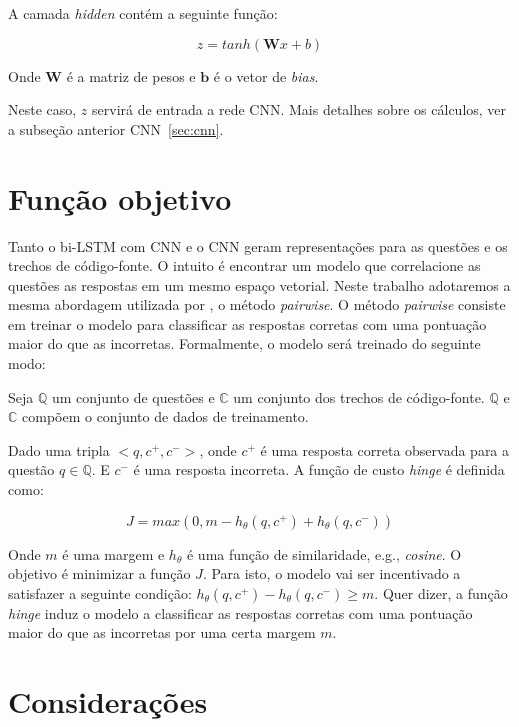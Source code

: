 A camada \textit{hidden} contém a seguinte função:

\begin{equation}
z = tanh(\bm{W}x + b)
\end{equation}

Onde $\bm{W}$ é a matriz de pesos e $\bm{b}$ é o vetor de \textit{bias}.

Neste caso, $z$ servirá de entrada a rede CNN. Mais detalhes sobre os cálculos, ver a subseção anterior CNN~\ref{sec:cnn}.


\section{Função objetivo}

Tanto o bi-LSTM com CNN e o CNN geram representações para as questões e os trechos de código-fonte. O intuito é encontrar um modelo que correlacione as questões as respostas em um mesmo espaço vetorial. Neste trabalho adotaremos a mesma abordagem utilizada por \cite{feng-2015}, o método \textit{pairwise}. O método \textit{pairwise} consiste em treinar o modelo para classificar as respostas corretas com uma pontuação maior do que as incorretas. Formalmente, o modelo será treinado do seguinte modo:

Seja $\mathbb{Q}$ um conjunto de questões e $\mathbb{C}$ um conjunto dos trechos de código-fonte. $\mathbb{Q}$ e $\mathbb{C}$ compõem o conjunto de dados de treinamento.

Dado uma tripla $<q, c^{+}, c^{-}>$, onde $c^{+}$ é uma resposta correta observada para a questão $q \in \mathbb{Q}$. E $c^{-}$ é uma resposta incorreta. A função de custo \textit{hinge} é definida como:

\begin{equation}
J = max(0, m - h_{\theta}(q, c^{+}) + h_{\theta}(q, c^{-}))
\end{equation}

Onde $m$ é uma margem e $h_{\theta}$ é uma função de similaridade, e.g., \textit{cosine}. O objetivo é minimizar a função $J$. Para isto, o modelo vai ser incentivado a satisfazer a seguinte condição: $h_{\theta}(q, c^{+}) - h_{\theta}(q, c^{-}) \geq m$. Quer dizer, a função \textit{hinge} induz o modelo a classificar as respostas corretas com uma pontuação maior do que as incorretas por uma certa margem $m$.


\section{Considerações}

